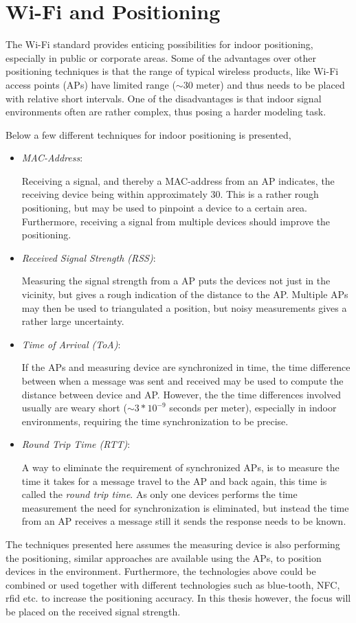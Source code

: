 \documentclass{LTHthesis}
\begin{document}
\section{Wi-Fi and Positioning}
%
The Wi-Fi standard provides enticing possibilities for indoor positioning, especially in public or corporate areas. Some of the advantages over other positioning techniques is that the range of typical wireless products, like Wi-Fi access points (APs) have limited range ($\sim 30$ meter) and thus needs to be placed with relative short intervals. One of the disadvantages is that indoor signal environments often are rather complex, thus posing a harder modeling task.

Below a few different techniques for indoor positioning is presented, 
%
\begin{itemize}
\item \emph{MAC-Address}:  

Receiving a signal, and thereby a MAC-address from an AP indicates, the receiving device being  within approximately $30$. This is a rather rough positioning, but may be used to pinpoint a device to a certain area. Furthermore, receiving a signal from multiple devices should improve the positioning. 
%
\item \emph{Received Signal Strength (RSS)}:

Measuring the signal strength from a AP puts the devices not just in the vicinity, but gives a rough indication of the distance to the AP. Multiple APs may then be used to triangulated a position, but noisy measurements gives a rather large uncertainty. 
%
\item \emph{Time of Arrival (ToA)}:

If the APs and measuring device are synchronized in time, the time difference between when a message was sent and received may be used to compute the distance between device and AP. However, the the time differences involved usually are weary short ($\sim 3*10^{-9}$ seconds per meter), especially in indoor environments, requiring the time synchronization to be precise.  
%
\item \emph{Round Trip Time (RTT)}: 

A way to eliminate the requirement of synchronized APs, is to measure the time it takes for a message travel to the AP and back again, this time is called the \emph{round trip time}. As only one devices performs the time measurement the need for synchronization is eliminated, but instead the time from an AP receives a message still it sends the response needs to be known.
%
\end{itemize}
%
The techniques presented here assumes the measuring device is also performing the positioning, similar approaches are available using the APs, to position devices in the environment. Furthermore, the technologies above could be combined or used together with different technologies such as blue-tooth, NFC, rfid etc. to increase the positioning accuracy. 
In this thesis however,  the focus will be placed on the received signal strength.
%
\end{document}
